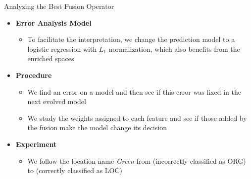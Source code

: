 \documentclass[10pt,=table]{beamer}
\newcommand*\circled[1]{\tikz[baseline=(char.base)]{
            \node[shape=circle,draw,inner sep=1pt] (char) {#1};}}
\begin{document}
\begin{frame}{Analyzing the Best Fusion Operator}
\begin{itemize}
\item<1-> \textbf{Error Analysis Model}
	\begin{itemize}
		\item<1-> To facilitate the interpretation, we change the prediction model to a logistic regression with $L_1$ normalization, which also benefits from the enriched spaces

	\end{itemize}
\item<2-> \textbf{Procedure}
	\begin{itemize}
		\item<2-> We find an error on a model and then see if this error was fixed in the next evolved model
		\item<2-> We study the weights assigned to each feature and see if those added by the fusion make the model change its decision
	\end{itemize}
\item<3-> \textbf{Experiment}
	\begin{itemize}
		\item<3-> We follow the location name \textit{Green} from \circled{$M_3$} (incorrectly classified as ORG) to \circled{$M_4$} (correctly classified as LOC)
		
	\end{itemize} 
\end{itemize}
\end{frame}
\end{document}

